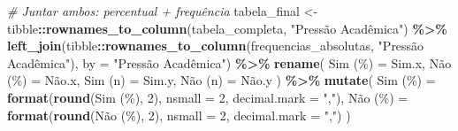 \documentclass[
]{article}
\newenvironment{Shaded}{\begin{snugshade}}{\end{snugshade}}
\newcommand{\AttributeTok}[1]{\textcolor[rgb]{0.13,0.29,0.53}{#1}}
\newcommand{\CommentTok}[1]{\textcolor[rgb]{0.56,0.35,0.01}{\textit{#1}}}
\newcommand{\DecValTok}[1]{\textcolor[rgb]{0.00,0.00,0.81}{#1}}
\newcommand{\FunctionTok}[1]{\textcolor[rgb]{0.13,0.29,0.53}{\textbf{#1}}}
\newcommand{\NormalTok}[1]{#1}
\newcommand{\OtherTok}[1]{\textcolor[rgb]{0.56,0.35,0.01}{#1}}
\newcommand{\SpecialCharTok}[1]{\textcolor[rgb]{0.81,0.36,0.00}{\textbf{#1}}}
\newcommand{\StringTok}[1]{\textcolor[rgb]{0.31,0.60,0.02}{#1}}
\begin{document}
\begin{Shaded}
\begin{Highlighting}[]
\CommentTok{\# Juntar ambos: percentual + frequência}
\NormalTok{tabela\_final }\OtherTok{\textless{}{-}}\NormalTok{ tibble}\SpecialCharTok{::}\FunctionTok{rownames\_to\_column}\NormalTok{(tabela\_completa, }\StringTok{"Pressão Acadêmica"}\NormalTok{) }\SpecialCharTok{\%\textgreater{}\%}
  \FunctionTok{left\_join}\NormalTok{(tibble}\SpecialCharTok{::}\FunctionTok{rownames\_to\_column}\NormalTok{(frequencias\_absolutas, }\StringTok{"Pressão Acadêmica"}\NormalTok{), }\AttributeTok{by =} \StringTok{"Pressão Acadêmica"}\NormalTok{) }\SpecialCharTok{\%\textgreater{}\%}
  \FunctionTok{rename}\NormalTok{(}
    \StringTok{\textasciigrave{}}\AttributeTok{Sim (\%)}\StringTok{\textasciigrave{}} \OtherTok{=}\NormalTok{ Sim.x,}
    \StringTok{\textasciigrave{}}\AttributeTok{Não (\%)}\StringTok{\textasciigrave{}} \OtherTok{=}\NormalTok{ Não.x,}
    \StringTok{\textasciigrave{}}\AttributeTok{Sim (n)}\StringTok{\textasciigrave{}} \OtherTok{=}\NormalTok{ Sim.y,}
    \StringTok{\textasciigrave{}}\AttributeTok{Não (n)}\StringTok{\textasciigrave{}} \OtherTok{=}\NormalTok{ Não.y}
\NormalTok{  ) }\SpecialCharTok{\%\textgreater{}\%}
  \FunctionTok{mutate}\NormalTok{(}
    \StringTok{\textasciigrave{}}\AttributeTok{Sim (\%)}\StringTok{\textasciigrave{}} \OtherTok{=} \FunctionTok{format}\NormalTok{(}\FunctionTok{round}\NormalTok{(}\StringTok{\textasciigrave{}}\AttributeTok{Sim (\%)}\StringTok{\textasciigrave{}}\NormalTok{, }\DecValTok{2}\NormalTok{), }\AttributeTok{nsmall =} \DecValTok{2}\NormalTok{, }\AttributeTok{decimal.mark =} \StringTok{","}\NormalTok{),}
    \StringTok{\textasciigrave{}}\AttributeTok{Não (\%)}\StringTok{\textasciigrave{}} \OtherTok{=} \FunctionTok{format}\NormalTok{(}\FunctionTok{round}\NormalTok{(}\StringTok{\textasciigrave{}}\AttributeTok{Não (\%)}\StringTok{\textasciigrave{}}\NormalTok{, }\DecValTok{2}\NormalTok{), }\AttributeTok{nsmall =} \DecValTok{2}\NormalTok{, }\AttributeTok{decimal.mark =} \StringTok{","}\NormalTok{)}
\NormalTok{  )}


\end{Highlighting}
\end{Shaded}
\end{document}

